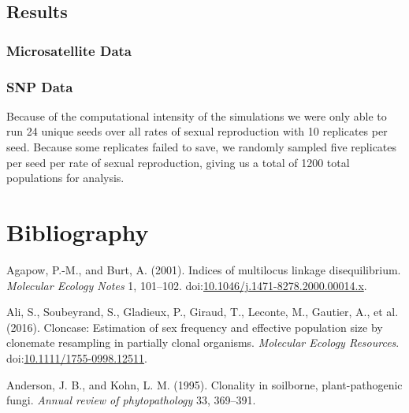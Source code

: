 \documentclass[double,12pt]{beavtex}
\begin{document}
  \section{Results}\label{results-1}
  
  \subsection{Microsatellite Data}\label{microsatellite-data}
  
  \subsection{SNP Data}\label{snp-data}
  
  Because of the computational intensity of the simulations we were only
  able to run 24 unique seeds over all rates of sexual reproduction with
  10 replicates per seed. Because some replicates failed to save, we
  randomly sampled five replicates per seed per rate of sexual
  reproduction, giving us a total of 1200 total populations for analysis.
  
  \backmatter
  
  \chapter{Bibliography}\label{bibliography}
  
  \noindent
  
  \setlength{\parindent}{-0.20in} \setlength{\leftskip}{0.20in}
  \setlength{\parskip}{8pt} \singlespacing
  
  \hypertarget{refs}{}
  \hypertarget{ref-Agapow_2001}{}
  Agapow, P.-M., and Burt, A. (2001). Indices of multilocus linkage
  disequilibrium. \emph{Molecular Ecology Notes} 1, 101--102.
  doi:\href{https://doi.org/10.1046/j.1471-8278.2000.00014.x}{10.1046/j.1471-8278.2000.00014.x}.
  
  \hypertarget{ref-ali2016cloncase}{}
  Ali, S., Soubeyrand, S., Gladieux, P., Giraud, T., Leconte, M., Gautier,
  A., et al. (2016). Cloncase: Estimation of sex frequency and effective
  population size by clonemate resampling in partially clonal organisms.
  \emph{Molecular Ecology Resources}.
  doi:\href{https://doi.org/10.1111/1755-0998.12511}{10.1111/1755-0998.12511}.
  
  \hypertarget{ref-anderson1995clonality}{}
  Anderson, J. B., and Kohn, L. M. (1995). Clonality in soilborne,
  plant-pathogenic fungi. \emph{Annual review of phytopathology} 33,
  369--391.
  
\end{document}
